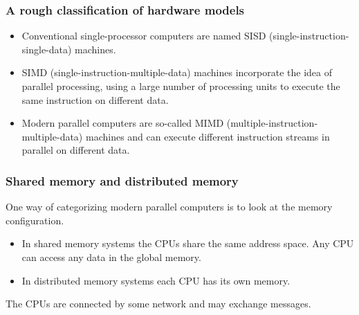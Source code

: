 \documentclass{beamer}
\begin{document}
\begin{frame}
\frametitle{A rough classification of hardware models}

\begin{block}{}

\begin{itemize}
\item Conventional single-processor computers are named SISD (single-instruction-single-data) machines.

\item SIMD (single-instruction-multiple-data) machines incorporate the idea of parallel processing, using a large number of processing units to execute the same instruction on different data.

\item Modern parallel computers are so-called MIMD (multiple-instruction-multiple-data) machines and can execute different instruction streams in parallel on different data.
\end{itemize}

\noindent
\end{block}
\end{frame}

\begin{frame}
\frametitle{Shared memory and distributed memory}

\begin{block}{}
One way of categorizing modern parallel computers is to look at the memory configuration.
\begin{itemize}
\item In shared memory systems the CPUs share the same address space. Any CPU can access any data in the global memory.

\item In distributed memory systems each CPU has its own memory.
\end{itemize}

\noindent
The CPUs are connected by some network and may exchange messages.

\end{block}
\end{frame}
\end{document}
